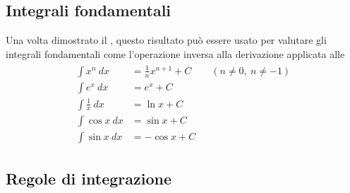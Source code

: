 \documentclass[letterpaper,10pt,italian]{jupyterBook}
\begin{document}
\subsection{Integrali fondamentali}
\label{\detokenize{ch/infinitesimal_calculus/integrals:integrali-fondamentali}}\label{\detokenize{ch/infinitesimal_calculus/integrals:infinitesimal-calculus-integrals-fund}}
\sphinxAtStartPar
Una volta dimostrato il {\hyperref[\detokenize{ch/infinitesimal_calculus/integrals:infinitesimal-calculus-integrals-thm-fund}]{}}, questo risultato può essere usato per valutare gli integrali fondamentali come l’operazione inversa alla derivazione applicata alle {\hyperref[\detokenize{ch/infinitesimal_calculus/integrals:infinitesimal-calculus-integrals-fund}]{}}
\begin{equation*}
\begin{split}\begin{aligned}
 \int x^n         \ dx & = \frac{1}{n} x^{n+1} + C  \qquad (n \neq 0, \ n \neq -1) \\ 
 \int e^x         \ dx & = e^x                 + C \\ 
 \int \frac{1}{x} \ dx & = \ln x               + C \\ 
 \int \cos x      \ dx & = \sin x              + C \\ 
 \int \sin x      \ dx & =-\cos x              + C    
\end{aligned}\end{split}
\end{equation*}

\subsection{Regole di integrazione}
\label{\detokenize{ch/infinitesimal_calculus/integrals:regole-di-integrazione}}
\end{document}
